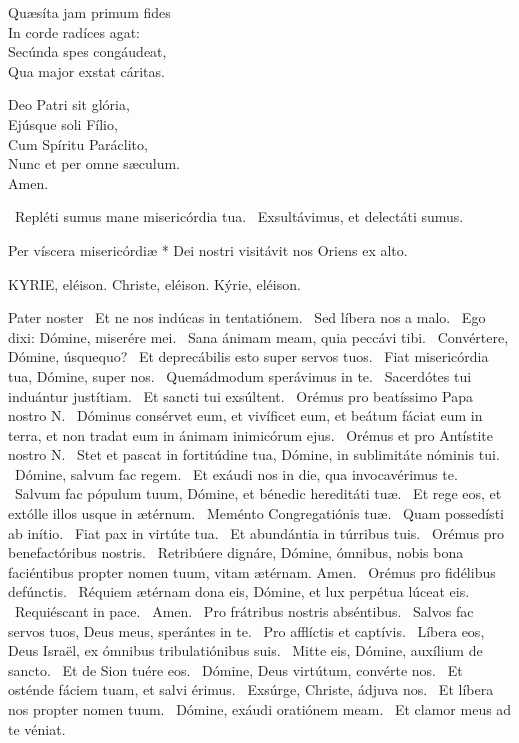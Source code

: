 Quæsíta jam primum fides\\
In corde radíces agat:\\
Secúnda spes congáudeat,\\
Qua major exstat cáritas.

Deo Patri sit glória,\\
Ejúsque soli Fílio,\\
Cum Spíritu Paráclito,\\
Nunc et per omne sæculum.\\
Amen.

\V\ Repléti sumus mane misericórdia tua. \R\ Exsultávimus, et delectáti sumus.

 Per víscera misericórdiæ * Dei nostri visitávit nos Oriens ex alto.



KYRIE, eléison. Christe, eléison. Kýrie, eléison.

Pater noster  \V\ Et ne nos indúcas in tentatiónem. \R\ Sed líbera nos a malo. \V\ Ego dixi: Dómine, miserére mei. \R\ Sana ánimam meam, quia peccávi tibi. \V\ Convértere, Dómine, úsquequo? \R\ Et deprecábilis esto super servos tuos. \V\ Fiat misericórdia tua, Dómine, super nos. \R\ Quemádmodum sperávimus in te. \V\ Sacerdótes tui induántur justítiam. \R\ Et sancti tui exsúltent. \V\ Orémus pro beatíssimo Papa nostro N. \R\ Dóminus consérvet eum, et vivíficet eum, et beátum fáciat eum in terra, et non tradat eum in ánimam inimicórum ejus. \V\ Orémus et pro Antístite nostro N. \R\ Stet et pascat in fortitúdine tua, Dómine, in sublimitáte nóminis tui. \V\ Dómine, salvum fac regem. \R\ Et exáudi nos in die, qua invocavérimus te. \V\ Salvum fac pópulum tuum, Dómine, et bénedic hereditáti tuæ. \R\ Et rege eos, et extólle illos usque in ætérnum. \V\ Meménto Congregatiónis tuæ. \R\ Quam possedísti ab inítio. \V\ Fiat pax in virtúte tua. \R\ Et abundántia in túrribus tuis. \V\ Orémus pro benefactóribus nostris. \R\ Retribúere dignáre, Dómine, ómnibus, nobis bona faciéntibus propter nomen tuum, vitam ætérnam. Amen. \V\ Orémus pro fidélibus defúnctis. \R\ Réquiem ætérnam dona eis, Dómine, et lux perpétua lúceat eis. \V\ Requiéscant in pace. \R\ Amen. \V\ Pro frátribus nostris abséntibus. \R\ Salvos fac servos tuos, Deus meus, sperántes in te. \V\ Pro afflíctis et captívis. \R\ Líbera eos, Deus Israël, ex ómnibus tribulatiónibus suis. \V\ Mitte eis, Dómine, auxílium de sancto. \R\ Et de Sion tuére eos. \V\ Dómine, Deus virtútum, convérte nos. \R\ Et osténde fáciem tuam, et salvi érimus. \V\ Exsúrge, Christe, ádjuva nos. \R\ Et líbera nos propter nomen tuum. \V\ Dómine, exáudi oratiónem meam. \R\ Et clamor meus ad te véniat.

